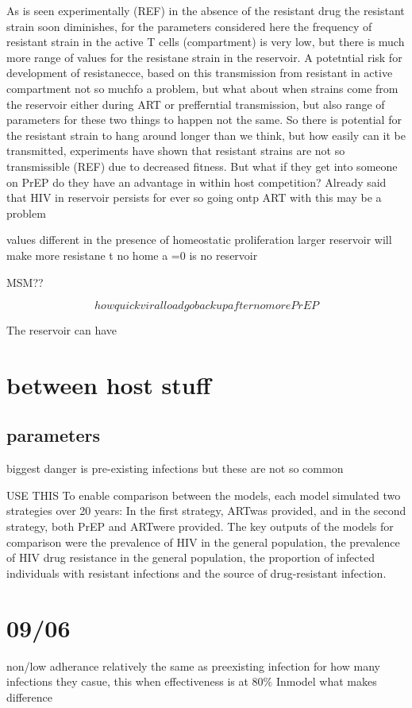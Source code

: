 \documentclass[DIV=15]{scrartcl}
\begin{document}
As is seen experimentally (REF) in the absence of the resistant drug the resistant strain soon diminishes,  for the parameters considered here the frequency of resistant strain in the active T cells (compartment) is very low, but there is much more range of values for the resistane strain in the reservoir. A potetntial risk for development 
of resistanecce, based on this transmission from resistant in active compartment not so muchfo a problem,  but what about when strains come from the reservoir either during ART or prefferntial transmission, but also  range of parameters for these two things to happen not the same. So there is potential for the resistant strain to hang around longer than we think, but how easily can it be transmitted, experiments have shown that resistant strains are not so transmissible (REF) due to decreased fitness.  But what if they get into someone on PrEP do they have an advantage in within host competition? Already said that HIV in reservoir persists for ever so going ontp ART with this may be a problem

values different in the presence of  homeostatic proliferation larger reservoir will make more resistane t
 no home a =0 is no reservoir

MSM??




$$how quick viral load go back up after no more PrEP$$

The reservoir can have 


\section{between host stuff}
   \subsection{parameters}
biggest danger is pre-existing infections but these are not so common


  
USE THIS
To enable comparison between the models, each model
simulated two strategies over 20 years: In the first strategy,
ARTwas provided, and in the second strategy, both PrEP
and ARTwere provided. The key outputs of the models
for comparison were the prevalence of HIV in the general
population, the prevalence of HIV drug resistance in
the general population, the proportion of infected
individuals with resistant infections and the source of
drug-resistant infection.


\section{09/06}
non/low adherance relatively the same as preexisting infection for how many infections they casue, this when effectiveness is at $ 80\%$
Inmodel what makes difference 
\end{document}
